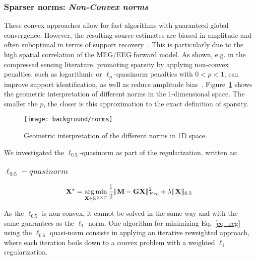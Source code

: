 \subsubsection*{Sparser norms: \textit{Non-Convex norms}}
These convex approaches allow for fast algorithms with guaranteed global convergence. However, the resulting source estimates are biased in amplitude and often suboptimal in terms of support recovery~\cite{candes2008enhancing}. This is particularly due to the high spatial correlation of the MEG/EEG forward model. As shown, e.g. in the compressed sensing literature, promoting sparsity by applying non-convex penalties, such as logarithmic or $\ell_p$-quasinorm penalties with $0 < p < 1$, can improve support identification, as well as reduce amplitude bias~\cite{candes2008enhancing,chartrand2007exact,saab2008stable}. Figure~\ref{fig:norms} shows the geometric interpretation of different norms in the 1-dimensional space. The smaller the $p$, the closer is this approximation to the exact definition of sparsity. 

\begin{figure}
\centering
	\texttt{[image: background/norms]}
    \caption{Geometric interpretation of the different norms in 1D space.}
	\label{fig:norms}
\end{figure}

We investigated the $\ell_{0.5}$-quasinorm as part of the regularization, written as:
\adjustwidth{1em}{0pt}
\subsubsection*{$\ell_{0.5}-quasinorm$}
\begin{equation} \label{eq_quasinorm}
	\mathbf{X}^\star = \mathop{\mathrm{arg}\,\mathrm{min}}_{\mathbf{X}\in\mathbb{R}^{S\times T}}\frac{1}{2}\|\mathbf{M}-\mathbf{GX}\|_{Fro}^2 + \lambda\|\mathbf{X}\|_{0.5}
\end{equation}
\endadjustwidth

As the $\ell_{0.5}$ is non-convex, it cannot be solved in the same way and with the same guarantees as the $\ell_1$-norm. One algorithm for minimizing Eq.~\eqref{eq_reg} using the $\ell_{0.5}$ quasi-norm consists in applying an iterative reweighted approach, where each iteration boils down to a convex problem with a weighted $\ell_1$ regularization.
\adjustwidth{1em}{0pt}

